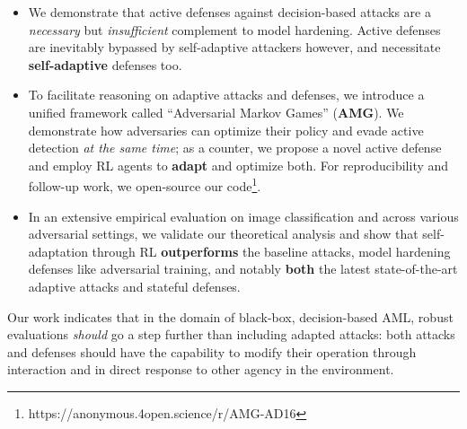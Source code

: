 \begin{itemize} %
\item We demonstrate that active defenses against decision-based attacks are a \textit{necessary} but \textit{insufficient} complement to model hardening.
Active defenses are inevitably bypassed by self-adaptive attackers however, and necessitate \textbf{self-adaptive} defenses too.
\item To facilitate reasoning on adaptive attacks and defenses, we introduce a unified framework called ``Adversarial Markov Games'' (\textbf{AMG}).
We demonstrate how adversaries can optimize their policy and evade active detection \textit{at the same time}; as a counter, we propose a novel active defense and employ RL agents to \textbf{adapt} and optimize both.
For reproducibility and follow-up work, we open-source our code\footnote{https://anonymous.4open.science/r/AMG-AD16}.
\item In an extensive empirical evaluation on image classification and across various adversarial settings, we validate our theoretical analysis and show that self-adaptation through RL \textbf{outperforms} the baseline attacks, model hardening defenses like adversarial training, and notably \textbf{both} the latest state-of-the-art adaptive attacks and stateful defenses.
\end{itemize}

Our work indicates that in the domain of black-box, decision-based \gls{AML}, robust evaluations \textit{should} go a step further than including adapted attacks: both attacks and defenses should have the capability to modify their operation through interaction and in direct response to other agency in the environment.



